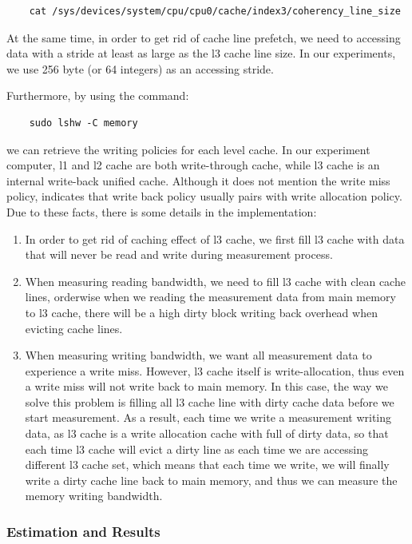 \begin{lstlisting}
    cat /sys/devices/system/cpu/cpu0/cache/index3/coherency_line_size
\end{lstlisting}

At the same time, in order to get rid of cache line prefetch, we need to accessing data with a stride at least as large as the l3 cache line size. In our experiments, we use 256 byte (or 64 integers) as an accessing stride.

Furthermore, by using the command:

\begin{lstlisting}
    sudo lshw -C memory
\end{lstlisting}

we can retrieve the writing policies for each level cache. In our experiment computer, l1 and l2 cache are both write-through cache, while l3 cache is an internal write-back unified cache. Although it does not mention the write miss policy, \cite{wiki:cache} indicates that write back policy usually pairs with write allocation policy. Due to these facts, there is some details in the implementation:

\begin{enumerate}
    \item In order to get rid of caching effect of l3 cache, we first fill l3 cache with data that will never be read and write during measurement process.
    \item When measuring reading bandwidth, we need to fill l3 cache with clean cache lines, orderwise when we reading the measurement data from main memory to l3 cache, there will be a high dirty block writing back overhead when evicting cache lines.
    \item When measuring writing bandwidth, we want all measurement data to experience a write miss. However, l3 cache itself is write-allocation, thus even a write miss will not write back to main memory. In this case, the way we solve this problem is filling all l3 cache line with dirty cache data before we start measurement. As a result, each time we write a measurement writing data, as l3 cache is a write allocation cache with full of dirty data, so that each time l3 cache will evict a dirty line as each time we are accessing different l3 cache set, which means that each time we write, we will finally write a dirty cache line back to main memory, and thus we can measure the memory writing bandwidth.
\end{enumerate}

\subsubsection{Estimation and Results}
\label{Memory_bandwidth_result_section}

